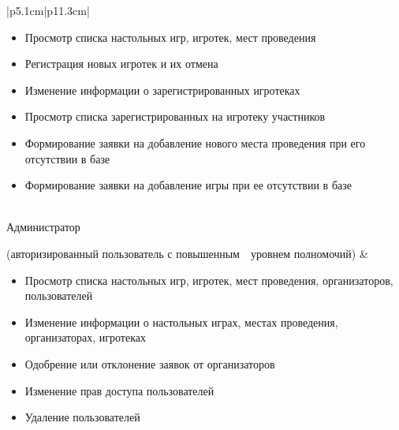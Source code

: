 \begin{table}[h!]
\begin{center}
\begin{threeparttable}
\begin{tabular}{|p{5.1cm}|p{11.3cm}|}
\begin{minipage}[t]{\linewidth}
                      \begin{itemize}[nosep,after=\strut]
                          \item Просмотр списка настольных игр, игротек, мест
                        проведения
                          \item Регистрация новых игротек и их отмена
                          \item Изменение информации о зарегистрированных
                              игротеках
                          \item Просмотр списка зарегистрированных на
                              \mbox{игротеку} участников
                          \item Формирование заявки на добавление нового
                              \mbox{места} проведения при его отсутствии в базе
                          \item Формирование заявки на добавление игры при ее
                        отсутствии в базе
                      \end{itemize}
                  \end{minipage}\\
            \hline
            Администратор \par (авторизированный пользователь
                    с \mbox{повышенным~~уровнем} полномочий)
                  & \begin{minipage}[t]{\linewidth}
                      \begin{itemize}[nosep,after=\strut]
                          \item Просмотр списка настольных игр, игротек, мест
                        проведения, организаторов, пользователей
                    \item Изменение информации о настольных играх, \mbox{местах}
                        проведения, организаторах, игротеках
                          \item Одобрение или отклонение заявок от
                              \mbox{организаторов}
                          \item Изменение прав доступа пользователей
                          \item Удаление пользователей
                      \end{itemize}
                  \end{minipage}\\
            \hline
        \end{tabular}
    \end{threeparttable}
    \end{center}
\end{table} 


